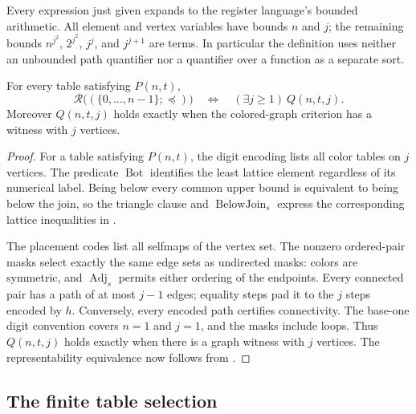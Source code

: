 Every expression just given expands to the register language's bounded
arithmetic.  All element and vertex variables have bounds $n$ and $j$;
the remaining bounds $n^{j^2}$, $2^{j^2}$, $j^j$, and $j^{j+1}$ are
terms.  In particular the definition uses neither an unbounded path
quantifier nor a quantifier over a function as a separate sort.

\begin{lemma}\label{q:arithmetic-criterion}
For every table satisfying $P(n,t)$,
\begin{equation}\label{q:arithmetic-R}
 \mathcal R\bigl((\{0,\ldots,n-1\};\preceq)\bigr)
       \quad\Longleftrightarrow\quad
                     (\exists j\ge1)\ Q(n,t,j).
\end{equation}
Moreover $Q(n,t,j)$ holds exactly when the colored-graph criterion has
a witness with $j$ vertices.
\end{lemma}

\begin{proof}
For a table satisfying $P(n,t)$, the digit encoding lists all color
tables on $j$ vertices.  The predicate $\operatorname{Bot}$ identifies
the least lattice element regardless of its numerical label.  Being
below every common upper bound is equivalent to being below the join,
so the triangle clause and $\operatorname{BelowJoin}_s$ express the
corresponding lattice inequalities in .

The placement codes list all selfmaps of the vertex set.  The nonzero
ordered-pair masks select exactly the same edge sets as undirected
masks: colors are symmetric, and $\operatorname{Adj}_s$ permits either
ordering of the endpoints.  Every connected pair has a path of at most
$j-1$ edges; equality steps pad it to the $j$ steps encoded by $h$.
Conversely, every encoded path certifies connectivity.  The base-one
digit convention covers $n=1$ and $j=1$, and the masks include loops.
Thus $Q(n,t,j)$ holds exactly when there is a graph witness with $j$
vertices.  The representability equivalence now follows from
.
\end{proof}

\subsection{The finite table selection}

